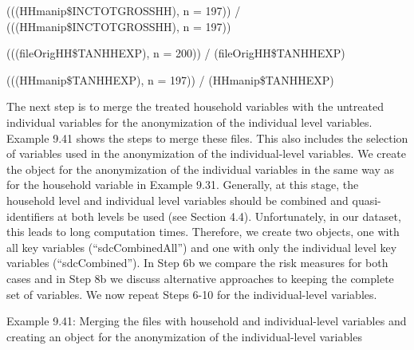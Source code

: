 \documentclass[letterpaper,10pt,english]{sphinxmanual}
\begin{document}

(((HHmanip\$INCTOTGROSSHH), n = 197)) /
(((HHmanip\$INCTOTGROSSHH), n = 197))


\begin{DUlineblock}{0em}
\item[] 
\item[] (((fileOrigHH\$TANHHEXP), n = 200)) /
(fileOrigHH\$TANHHEXP)
\end{DUlineblock}


(((HHmanip\$TANHHEXP), n = 197)) /
(HHmanip\$TANHHEXP)



The next step is to merge the treated household variables with the
untreated individual variables for the anonymization of the individual
level variables. Example 9.41 shows the steps to merge these files. This
also includes the selection of variables used in the anonymization of
the individual-level variables. We create the  object for the
anonymization of the individual variables in the same way as for the
household variable in Example 9.31. Generally, at this stage, the
household level and individual level variables should be combined and
quasi-identifiers at both levels be used (see Section 4.4).
Unfortunately, in our dataset, this leads to long computation times.
Therefore, we create two  objects, one with all key variables
(“sdcCombinedAll”) and one with only the individual level key variables
(“sdcCombined”). In Step 6b we compare the risk measures for both cases
and in Step 8b we discuss alternative approaches to keeping the complete
set of variables. We now repeat Steps 6-10 for the individual-level
variables.

Example 9.41: Merging the files with household and individual-level
variables and creating an  object for the anonymization of the
individual-level variables
\end{document}
